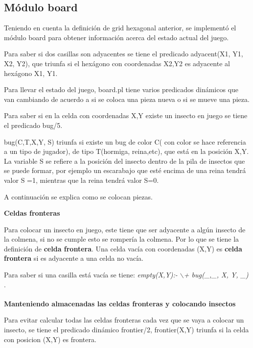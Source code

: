\documentclass[12pt,letterpaper]{article}
\begin{document}
\subsection*{M\'odulo board}
	Teniendo en cuenta la definici\'on de grid hexagonal anterior, se implement\'o el m\'odulo board para obtener informaci\'on acerca del estado actual del juego.
	
	Para saber si dos casillas son adyacentes se tiene el predicado adyacent(X1, Y1, X2, Y2), que triunfa si el hex\'agono con coordenadas X2,Y2 es adyacente al hex\'agono X1, Y1.
	
	Para llevar el estado del juego, board.pl tiene varios predicados din\'amicos que van cambiando de acuerdo a si se coloca una pieza nueva o si se mueve una pieza. 
	
	Para saber si en la celda con coordenadas X,Y existe un insecto en juego se tiene el predicado bug/5.
	
	bug(C,T,X,Y, S) triunfa si existe un bug de color C( con color se hace referencia a un tipo de jugador), de tipo T(hormiga, reina,etc), que est\'a en la posici\'on X,Y. La variable S se refiere a la posici\'on del insecto dentro de la pila de insectos que se puede formar, por ejemplo un escarabajo que est\'e encima de una reina tendr\'a valor S =1, mientras que la reina tendr\'a valor S=0.
	
	A continuaci\'on se explica como se colocan piezas.
	
	\begin{flushleft}
		\textbf{Celdas fronteras}
	\end{flushleft} 
	 Para colocar un insecto en juego, este tiene que ser adyacente a alg\'un insecto de la colmena, si no se cumple esto se romper\'ia la colmena. Por lo que se tiene la definici\'on de \textbf{celda frontera}. Una celda vac\'ia con coordenadas (X,Y) es \textbf{celda frontera} si es adyacente a una celda no vac\'ia.
	 
	 Para saber si una casilla est\'a vac\'ia se tiene: \textit{empty(X,Y):- $\backslash$+ bug(\_,\_, X, Y, \_) }.
	 
	 \paragraph{} 
	 	\begin{flushleft}
	 	\textbf{Manteniendo almacenadas las celdas fronteras y colocando insectos}
	 \end{flushleft} 
	 Para evitar calcular todas las celdas fronteras cada vez que se vaya a colocar un insecto, se tiene el predicado din\'amico frontier/2, frontier(X,Y) triunfa si la celda con posicion (X,Y) es frontera.
	 
\end{document}
